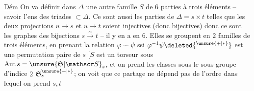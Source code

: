 \uline{Dém} On va définir dans $\Delta$ une autre famille $S$ de $6$ parties à trois éléments -- savoir l'ens  des triades $\subset\Delta$. Ce sont aussi les parties  de $\Delta=s\times t$  telles que les deux projections $u\to s$ et $u\to t$ soient injectives (donc bijectives) donc ce sont les graphes des bijections $s\xrightarrow{\sim}t$ -- il y en a en $6$.
Elles se groupent en $2$ familles de trois éléments, en prenant  la relation $\varphi\sim\psi$ ssi $\varphi^{-1}\psi\deleted{^{\unsure{+|\ast}}}$ est une permutation paire de $s$  [$S$  est un torseur sous  $\mathrm{Aut}\,s=\unsure{\mathfrak S|\mathscr S}_s$, et on prend les  classes sous le sous-groupe d'indice $2$ $\mathfrak S_s^{\unsure{+|\ast}}$; on voit que ce partage ne dépend pas de l'ordre dans lequel on prend $s,t$ 
